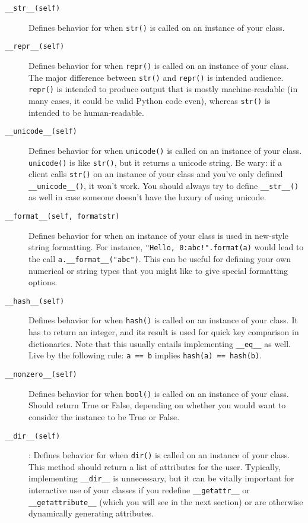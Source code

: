 \documentclass[a4paper,11pt]{article}
\newcommand{\code}[1]{\texttt{#1}}
\begin{document}
\begin{description}

\item[\code{__str__(self)}]
Defines behavior for when \code{str()} is called on an instance of your class.
\item[\code{__repr__(self)}]
Defines behavior for when \code{repr()} is called on an instance of your class. The major difference between \code{str()} and \code{repr()} is intended audience. \code{repr()} is intended to produce output that is mostly machine-readable (in many cases, it could be valid Python code even), whereas \code{str()} is intended to be human-readable.
\item[\code{__unicode__(self)}]
Defines behavior for when \code{unicode()} is called on an instance of your class. \code{unicode()} is like \code{str()}, but it returns a unicode string. Be wary: if a client calls \code{str()} on an instance of your class and you've only defined \code{__unicode__()}, it won't work. You should always try to define \code{__str__()} as well in case someone doesn't have the luxury of using unicode.
\item[\code{__format__(self, formatstr)}]
Defines behavior for when an instance of your class is used in new-style string formatting. For instance, \code{"Hello, {0:abc}!".format(a)} would lead to the call \code{a.__format__("abc")}. This can be useful for defining your own numerical or string types that you might like to give special formatting options.
\item[\code{__hash__(self)}]
Defines behavior for when \code{hash()} is called on an instance of your class. It has to return an integer, and its result is used for quick key comparison in dictionaries. Note that this usually entails implementing \code{__eq__} as well. Live by the following rule: \code{a == b} implies \code{hash(a) == hash(b)}.
\item[\code{__nonzero__(self)}]
Defines behavior for when \code{bool()} is called on an instance of your class. Should return True or False, depending on whether you would want to consider the instance to be True or False.
\item[\code{__dir__(self)}]
:    Defines behavior for when \code{dir()} is called on an instance of your class. This method should return a list of attributes for the user. Typically, implementing \code{__dir__} is unnecessary, but it can be vitally important for interactive use of your classes if you redefine \code{__getattr__} or \code{__getattribute__} (which you will see in the next section) or are otherwise dynamically generating attributes.

\end{description}
\end{document}
